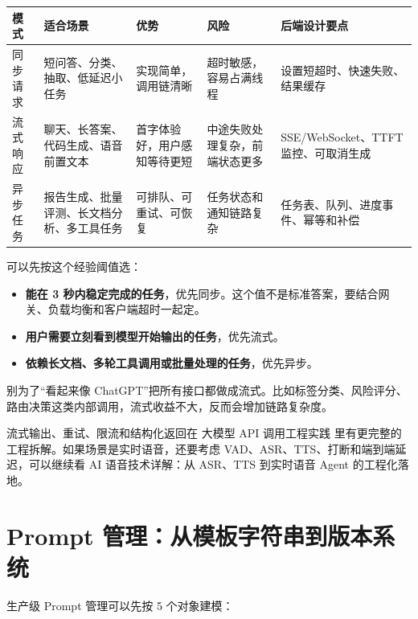 \documentclass[9pt,a4paper,twocolumn]{ctexart}
\begin{document}
{\footnotesize
\begin{tabular}{|p{}|p{}|p{}|p{}|p{}|}
\hline
\textbf{模式} & \textbf{适合场景} & \textbf{优势} & \textbf{风险} & \textbf{后端设计要点} \\
\hline
同步请求 & 短问答、分类、抽取、低延迟小任务 & 实现简单，调用链清晰 & 超时敏感，容易占满线程 & 设置短超时、快速失败、结果缓存 \\
\hline
流式响应 & 聊天、长答案、代码生成、语音前置文本 & 首字体验好，用户感知等待更短 & 中途失败处理复杂，前端状态更多 & SSE/WebSocket、TTFT 监控、可取消生成 \\
\hline
异步任务 & 报告生成、批量评测、长文档分析、多工具任务 & 可排队、可重试、可恢复 & 任务状态和通知链路复杂 & 任务表、队列、进度事件、幂等和补偿 \\
\hline
\end{tabular}
}



可以先按这个经验阈值选：


\begin{itemize}[itemsep=1pt, topsep=2pt]
  \item \textbf{能在 3 秒内稳定完成的任务}，优先同步。这个值不是标准答案，要结合网关、负载均衡和客户端超时一起定。
  \item \textbf{用户需要立刻看到模型开始输出的任务}，优先流式。
  \item \textbf{依赖长文档、多轮工具调用或批量处理的任务}，优先异步。
\end{itemize}


别为了“看起来像 ChatGPT”把所有接口都做成流式。比如标签分类、风险评分、路由决策这类内部调用，流式收益不大，反而会增加链路复杂度。



流式输出、重试、限流和结构化返回在 大模型 API 调用工程实践 里有更完整的工程拆解。如果场景是实时语音，还要考虑 VAD、ASR、TTS、打断和端到端延迟，可以继续看 AI 语音技术详解：从 ASR、TTS 到实时语音 Agent 的工程化落地。



\section*{Prompt 管理：从模板字符串到版本系统}


生产级 Prompt 管理可以先按 5 个对象建模：
\end{document}
